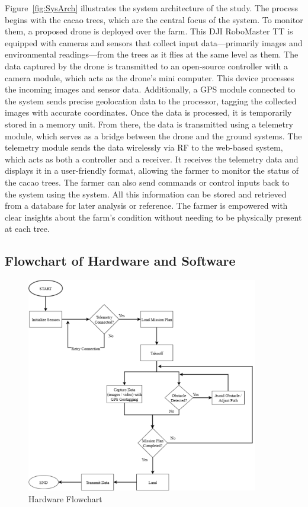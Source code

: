 Figure~\ref{fig:SysArch} illustrates the system architecture of the study. The process begins with the cacao trees, which are the central focus of the system. To monitor them, a proposed drone is deployed over the farm. This DJI RoboMaster TT is equipped with cameras and sensors that collect input data—primarily images and environmental readings—from the trees as it flies at the same level as them. The data captured by the drone is transmitted to an open-source controller with a camera module, which acts as the drone’s mini computer. This device processes the incoming images and sensor data. Additionally, a GPS module connected to the system sends precise geolocation data to the processor, tagging the collected images with accurate coordinates. Once the data is processed, it is temporarily stored in a memory unit. From there, the data is transmitted using a telemetry module, which serves as a bridge between the drone and the ground systems. The telemetry module sends the data wirelessly via RF to the web-based system, which acts as both a controller and a receiver. It receives the telemetry data and displays it in a user-friendly format, allowing the farmer to monitor the status of the cacao trees. The farmer can also send commands or control inputs back to the system using the system. All this information can be stored and retrieved from a database for later analysis or reference. The farmer is empowered with clear insights about the farm’s condition without needing to be physically present at each tree.

\subsection*{Flowchart of Hardware and Software}

\begin{figure}[H]
	\centering
	\caption{Hardware Flowchart}
	\label{fig:HardFlow}
	\includegraphics[width=0.9\textwidth]{figures/Hard_Flow.pdf}
\end{figure}

